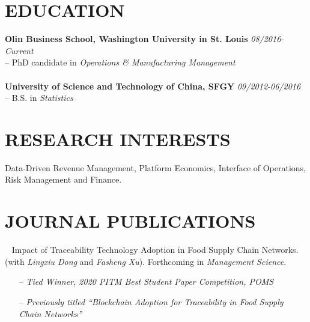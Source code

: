\documentclass[margin, 10pt]{res} %
\begin{document}
\begin{resume}



\section{\textbf{EDUCATION}}
{\bf Olin Business School, Washington University in St. Louis} \hfill {\em 08/2016-Current} \\ 
-- PhD candidate in {\it Operations \& Manufacturing Management} \\
~
\\
{\bf University of Science and Technology of China, SFGY} \hfill {\em 09/2012-06/2016} \\ 
-- B.S. in {\it Statistics}\\
 
\section{RESEARCH INTERESTS} 
Data-Driven Revenue Management, Platform Economics, Interface of Operations, Risk Management and Finance.
 
\section{JOURNAL PUBLICATIONS}
~
Impact of Traceability Technology Adoption in Food Supply Chain Networks. (with {\it Lingxiu Dong} and {\it Fasheng Xu}).
Forthcoming in \textit{Management Science}. 
\begin{itemize}
    \item[--] {\it Tied Winner, 2020 PITM Best Student Paper Competition, POMS}
    \item[--] {\it Previously titled ``Blockchain Adoption for Traceability in Food Supply Chain Networks''}
\end{itemize}



\end{resume}
\end{document}
